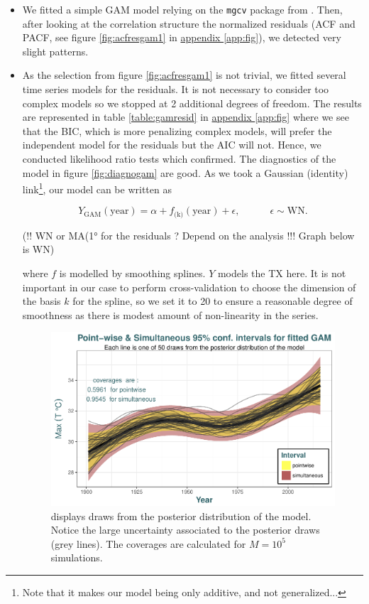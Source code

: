 \begin{itemize}
\item We fitted a simple GAM model relying on the \texttt{mgcv} package from \citet{maindonald_data_2006}. Then, after looking at the correlation structure the normalized residuals (ACF and PACF, see figure \ref{fig:acfresgam1} in \hyperref[app:fig]{appendix \ref{app:fig}}), we detected very slight patterns.

\item As the selection from figure \ref{fig:acfresgam1} is not trivial, we fitted several time series models for the residuals. It is not necessary to consider too complex models so we stopped at 2 additional degrees of freedom. The results are represented in table \ref{table:gamresid} in \hyperref[app:fig]{appendix \ref{app:fig}} where we see that the BIC, which is more penalizing complex models, will prefer the independent model for the residuals but the AIC will not. Hence, we conducted likelihood ratio tests which confirmed. The diagnostics of the model in figure \ref{fig:diagnogam} are good. As we took a Gaussian (identity) link\footnote{Note that it makes our model being only additive, and not generalized...}, our model can be written as

\begin{equation}\label{eq:gam}
Y_{\text{GAM}}(\text{year}) = \alpha + f_{\text{(k)}}(\text{year})+\epsilon , \qquad\quad \epsilon\sim\text{WN}.
\end{equation}

(!! WN or MA(1° for the residuals ? Depend on the analysis !!! Graph below is WN)


where $f$ is modelled by smoothing splines. $Y$ models the TX here. It is not important in our case to perform cross-validation to choose the dimension of the basis $k$ for the spline, so we set it to 20 to ensure a reasonable degree of smoothness as there is modest amount of non-linearity in the series.

\begin{figure}[!htb]
\centering	\includegraphics[width=.75\linewidth]{post_draws.pdf}\caption{displays draws from the posterior distribution of the model. Notice the large uncertainty associated to the posterior draws (grey lines).  The coverages are calculated for $M=10^5$ simulations. }\label{fig:post_draws}
\end{figure}


\end{itemize}
